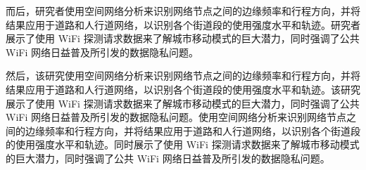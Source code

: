 而后，研究者使用空间网络分析来识别网络节点之间的边缘频率和行程方向，并将结果应用于道路和人行道网络，以识别各个街道段的使用强度水平和轨迹。研究者展示了使用 WiFi 探测请求数据来了解城市移动模式的巨大潜力，同时强调了公共 WiFi 网络日益普及所引发的数据隐私问题。

然后，该研究使用空间网络分析来识别网络节点之间的边缘频率和行程方向，并将结果应用于道路和人行道网络，以识别各个街道段的使用强度水平和轨迹。该研究展示了使用 WiFi 探测请求数据来了解城市移动模式的巨大潜力，同时强调了公共 WiFi 网络日益普及所引发的数据隐私问题。使用空间网络分析来识别网络节点之间的边缘频率和行程方向，并将结果应用于道路和人行道网络，以识别各个街道段的使用强度水平和轨迹。同时展示了使用 WiFi 探测请求数据来了解城市移动模式的巨大潜力，同时强调了公共 WiFi 网络日益普及所引发的数据隐私问题。
